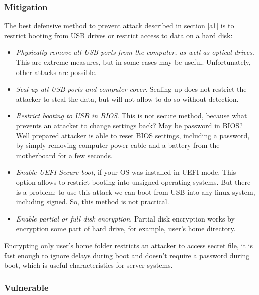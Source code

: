 \subsubsection*{Mitigation}
The best defensive method to prevent attack described in section \ref{a1} is to restrict booting from USB drives or restrict access to data on a hard disk:
\begin{itemize}
    \item \textit{Physically remove all USB ports from the computer, as well as optical drives}. This are extreme measures, but in some cases may be useful. Unfortunately, other attacks are possible.
    
    \item \textit{Seal up all USB ports and computer cover}. Sealing up does not restrict the attacker to steal the data, but will not allow to do so without detection. 
    
    \item \textit{Restrict booting to USB in BIOS}. This is not secure method, because what prevents an attacker to change settings back? May be password in BIOS? Well prepared attacker is able to reset BIOS settings, including a password, by simply removing computer power cable and a battery from the motherboard for a few seconds.
    
    \item \textit{Enable UEFI Secure boot}, if your OS was installed in UEFI mode. This option allows to restrict booting into unsigned operating systems. But there is a problem: to use this attack we can boot from USB into any linux system, including signed. So, this method is not practical.
    
    \item \textit{Enable partial or full disk encryption}. Partial disk encryption works by encryption some part of hard drive, for example, user's home directory. 
\end{itemize}

Encrypting only user's home folder restricts an attacker to access secret file, it is fast enough to ignore delays during boot and doesn't require a password during boot, which is useful characteristics for server systems. 


\subsubsection*{Vulnerable}





